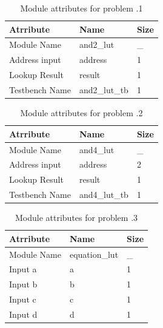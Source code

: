 \documentclass[a4paper,10pt]{article}
\theoremstyle{mytheor}
\newcounter{problemNumber}
\begin{document}
{   \begin{table}[!h]
     \centering
     \caption{Module attributes for problem \theproblemNumber.1}
     \label{table:problem-4.1-attr}
     \renewcommand{\arraystretch}{1.1} 
     \begin{tabularx}{0.8\textwidth}{|X|X|X|}
       \hline
       \rowcolor{greatblue}
       \color{white} Atrribute & \color{white}Name & \color{white}Size \\
       \hline
       Module Name     & and2\_lut     & \_  \\
       Address input   & address       &  1  \\ 
       Lookup Result   & result        &  1  \\
       Testbench Name  & and2\_lut\_tb &  1  \\
       \hline
     \end{tabularx}
   \end{table}

   \begin{table}[!h]
     \centering
     \caption{Module attributes for problem \theproblemNumber.2}
     \label{table:problem-4.2-attr}
     \renewcommand{\arraystretch}{1.1} 
     \begin{tabularx}{0.8\textwidth}{|X|X|X|}
       \hline
       \rowcolor{greatblue}
       \color{white} Atrribute & \color{white}Name & \color{white}Size \\
       \hline
       Module Name     & and4\_lut     & \_  \\
       Address input   & address       &  2  \\
       Lookup Result   & result        &  1  \\
       Testbench Name  & and4\_lut\_tb &  1  \\
       \hline
     \end{tabularx}
   \end{table}

   \begin{table}[!h]
     \centering
     \caption{Module attributes for problem \theproblemNumber.3}
     \label{table:problem-4.3-attr}
     \renewcommand{\arraystretch}{1.1} 
     \begin{tabularx}{0.8\textwidth}{|X|X|X|}
       \hline
       \rowcolor{greatblue}
       \color{white} Atrribute & \color{white}Name & \color{white}Size \\
       \hline
       Module Name     & equation\_lut     & \_  \\
       Input a         & a                 &  1  \\
       Input b         & b                 &  1  \\
       Input c         & c                 &  1  \\
       Input d         & d                 &  1  \\


\end{tabularx}
\end{table}}
\end{document}
